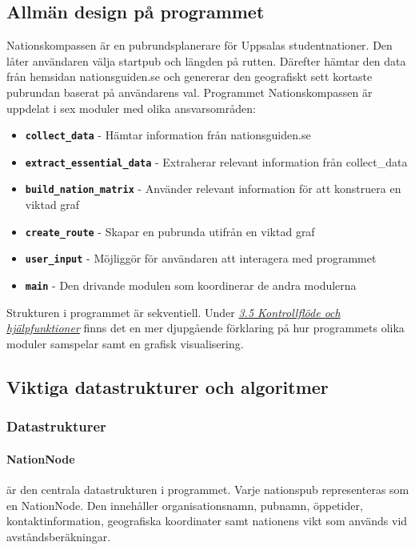 \documentclass[a4paper, 12pt]{article}
\begin{document}
    \subsection{Allmän design på programmet}
    \label{subsec: design}
        Nationskompassen är en pubrundsplanerare för Uppsalas studentnationer. Den låter användaren välja startpub och längden på rutten. Därefter hämtar den data från hemsidan nationsguiden.se och genererar den geografiskt sett kortaste pubrundan baserat på användarens val. Programmet Nationskompassen är uppdelat i sex moduler med olika ansvarsområden:
        \begin{itemize}
            \item \textbf{\texttt{collect\_data}} - Hämtar information från nationsguiden.se
            \item \textbf{\texttt{extract\_essential\_data}} - Extraherar relevant information från collect\_data
            \item \textbf{\texttt{build\_nation\_matrix}} - Använder relevant information för att konstruera en viktad graf
            \item \textbf{\texttt{create\_route}} - Skapar en pubrunda utifrån en viktad graf
            \item \textbf{\texttt{user\_input}} - Möjliggör för användaren att interagera med programmet
            \item \textbf{\texttt{main}} - Den drivande modulen som koordinerar de andra modulerna
        \end{itemize}
        Strukturen i programmet är sekventiell. Under \hyperref[subsec: flöde]{\textit{3.5 Kontrollflöde och hjälpfunktioner}} finns det en mer djupgående förklaring på hur programmets olika moduler samspelar samt en grafisk visualisering. 

    \subsection{Viktiga datastrukturer och algoritmer}
    \label{subsec: DSAL}

        \subsubsection{Datastrukturer}
        \label{subsubsec: DS}
            \paragraph{NationNode}
                är den centrala datastrukturen i programmet. Varje nationspub representeras som en NationNode. Den innehåller organisationsnamn, pubnamn, öppetider, kontaktinformation, geografiska koordinater samt nationens vikt som används vid avståndsberäkningar.
\end{document}

